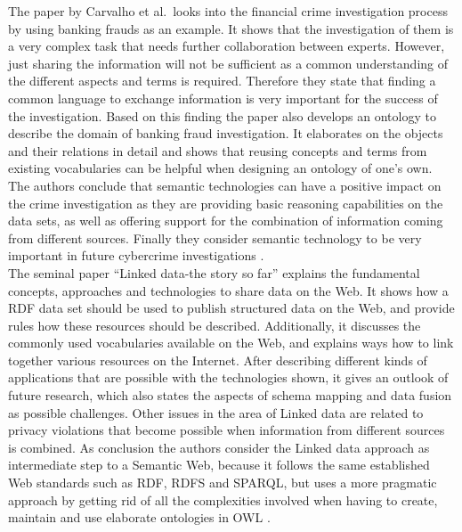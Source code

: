 The paper by Carvalho et al.\ looks into the financial crime investigation process by using banking frauds as an example. It shows that the investigation of them is a very complex task that needs further collaboration between experts. However, just sharing the information will not be sufficient as a common understanding of the different aspects and terms is required. Therefore they state that finding a common language to exchange information is very important for the success of the investigation. Based on this finding the paper also develops an ontology to describe the domain of banking fraud investigation. It elaborates on the objects and their relations in detail and shows that reusing concepts and terms from existing vocabularies can be helpful when designing an ontology of one's own. The authors conclude that semantic technologies can have a positive impact on the crime investigation as they are providing basic reasoning capabilities on the data sets, as well as offering support for the combination of information coming from different sources. Finally they consider semantic technology to be very important in future cybercrime investigations \citep{carvalhoapplying}. \\

The seminal paper ``Linked data-the story so far'' explains the fundamental concepts, approaches and technologies to share data on the Web. It shows how a \gls{RDF} data set should be used to publish structured data on the Web, and provide rules how these resources should be described. Additionally, it discusses the commonly used vocabularies available on the Web, and explains ways how to link together various resources on the Internet. After describing different kinds of applications that are possible with the technologies shown, it gives an outlook of future research, which also states the aspects of schema mapping and data fusion as possible challenges. Other issues in the area of Linked data are related to privacy violations that become possible when information from different sources is combined. As conclusion the authors consider the Linked data approach as intermediate step to a Semantic Web, because it follows the same established Web standards such as \gls{RDF}, \gls{RDFS} and \gls{SPARQL}, but uses a more pragmatic approach by getting rid of all the complexities involved when having to create, maintain and use elaborate ontologies in \gls{OWL} \citep{bizer2009linked}. \\


